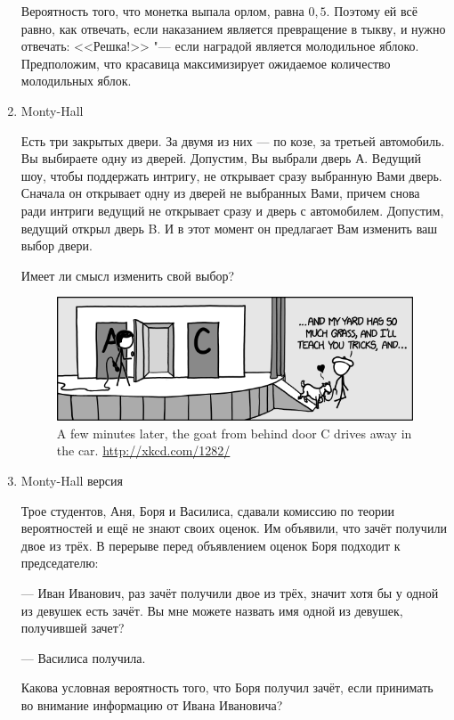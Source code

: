 \documentclass[nobib]{tufte-handout}
\begin{document}
\begin{enumerate}
\begin{solution}
Вероятность того, что монетка выпала орлом, равна $0{,}5$. Поэтому ей
всё равно, как отвечать, если наказанием является превращение в
тыкву, и нужно отвечать: <<Решка!>> "--- если наградой является
молодильное яблоко. Предположим, что красавица максимизирует
ожидаемое количество молодильных яблок. 
\end{solution}

\item Monty-Hall 

Есть три закрытых двери. За двумя из них --- по козе, за третьей автомобиль. Вы выбираете одну из дверей. Допустим, Вы выбрали дверь А. Ведущий шоу, чтобы поддержать интригу, не открывает сразу выбранную Вами дверь. Сначала он открывает одну из дверей не выбранных Вами, причем снова ради интриги ведущий не открывает сразу и дверь с автомобилем. Допустим, ведущий открыл дверь B. И в этот момент он предлагает Вам изменить ваш выбор двери.

Имеет ли смысл изменить свой выбор?

\begin{figure}
  \includegraphics[width=17cm]{monty_hall}
  \caption{A few minutes later, the goat from behind door C drives away in the car. \url{http://xkcd.com/1282/}}
\end{figure}


\item Monty-Hall версия

Трое студентов, Аня, Боря и Василиса, сдавали комиссию по теории вероятностей и ещё не знают своих оценок. Им объявили, что зачёт получили двое из трёх. В перерыве перед объявлением оценок Боря подходит к председателю:

--- Иван Иванович, раз зачёт получили двое из трёх, значит хотя бы у одной из девушек есть зачёт. Вы мне можете назвать имя одной из девушек, получившей зачет?

--- Василиса получила.

Какова условная вероятность того, что Боря получил зачёт, если принимать во внимание информацию от Ивана Ивановича?


\end{enumerate}
\end{document}
